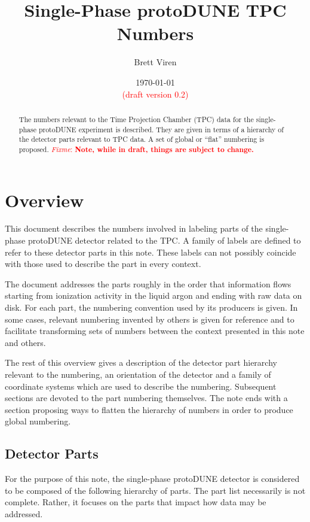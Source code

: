 \documentclass[pdftex,12pt,letter]{article}
\author{Brett Viren}
\date{\today \\ \textcolor{red}{(draft version 0.2)}}
\title{Single-Phase protoDUNE TPC Numbers}
\newcommand{\fixme}[1]{\textcolor{red}{\textit{Fixme}: \textbf{#1}}}
\begin{document}
\maketitle

\begin{abstract}
  The numbers relevant to the Time Projection Chamber (TPC) data for
  the single-phase protoDUNE experiment is described.  They are given
  in terms of a hierarchy of the detector parts relevant to TPC data.
  A set of global or ``flat'' numbering is proposed.  \fixme{Note,
    while in draft, things are subject to change.}
\end{abstract}

\tableofcontents
\newpage
\section{Overview}

This document describes the numbers involved in labeling parts of the
single-phase protoDUNE detector related to the TPC.  A family of
labels are defined to refer to these detector parts in this note.
These labels can not possibly coincide with those used to describe the
part in every context. 

The document addresses the parts roughly in the order that information
flows starting from ionization activity in the liquid argon and ending
with raw data on disk.  For each part, the numbering convention used
by its producers is given.  In some cases, relevant numbering invented
by others is given for reference and to facilitate transforming sets
of numbers between the context presented in this note and others.

The rest of this overview gives a description of the detector part
hierarchy relevant to the numbering, an orientation of the detector
and a family of coordinate systems which are used to describe the
numbering.  Subsequent sections are devoted to the part numbering
themselves.  The note ends with a section proposing ways to flatten
the hierarchy of numbers in order to produce global numbering.

\subsection{Detector Parts}
\label{sec:parts}

For the purpose of this note, the single-phase protoDUNE detector is
considered to be composed of the following hierarchy of parts.  The
part list necessarily is not complete.  Rather, it focuses on the
parts that impact how data may be addressed.
\end{document}
